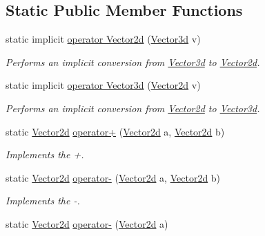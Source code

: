\subsection*{Static Public Member Functions}
\begin{DoxyCompactItemize}
\item 
static implicit \hyperlink{struct_unity_engine_1_1_vector2d_a410f55f0ddfcd56c0bea100d3eeae450}{operator Vector2d} (\hyperlink{struct_unity_engine_1_1_vector3d}{Vector3d} v)
\begin{DoxyCompactList}\small\item\em Performs an implicit conversion from \hyperlink{struct_unity_engine_1_1_vector3d}{Vector3d} to \hyperlink{struct_unity_engine_1_1_vector2d}{Vector2d}. \end{DoxyCompactList}\item 
static implicit \hyperlink{struct_unity_engine_1_1_vector2d_ad814c24e4e18473237b7f20701b2050b}{operator Vector3d} (\hyperlink{struct_unity_engine_1_1_vector2d}{Vector2d} v)
\begin{DoxyCompactList}\small\item\em Performs an implicit conversion from \hyperlink{struct_unity_engine_1_1_vector2d}{Vector2d} to \hyperlink{struct_unity_engine_1_1_vector3d}{Vector3d}. \end{DoxyCompactList}\item 
static \hyperlink{struct_unity_engine_1_1_vector2d}{Vector2d} \hyperlink{struct_unity_engine_1_1_vector2d_afdef6b104842871b883ad16abe0ca2a7}{operator+} (\hyperlink{struct_unity_engine_1_1_vector2d}{Vector2d} a, \hyperlink{struct_unity_engine_1_1_vector2d}{Vector2d} b)
\begin{DoxyCompactList}\small\item\em Implements the +. \end{DoxyCompactList}\item 
static \hyperlink{struct_unity_engine_1_1_vector2d}{Vector2d} \hyperlink{struct_unity_engine_1_1_vector2d_a34dc57a98b71bd6c0fbb448a7c25a4f9}{operator-\/} (\hyperlink{struct_unity_engine_1_1_vector2d}{Vector2d} a, \hyperlink{struct_unity_engine_1_1_vector2d}{Vector2d} b)
\begin{DoxyCompactList}\small\item\em Implements the -\/. \end{DoxyCompactList}\item 
static \hyperlink{struct_unity_engine_1_1_vector2d}{Vector2d} \hyperlink{struct_unity_engine_1_1_vector2d_a58bb462629cca1164ebdae3f93fda17e}{operator-\/} (\hyperlink{struct_unity_engine_1_1_vector2d}{Vector2d} a)

\end{DoxyCompactItemize}
